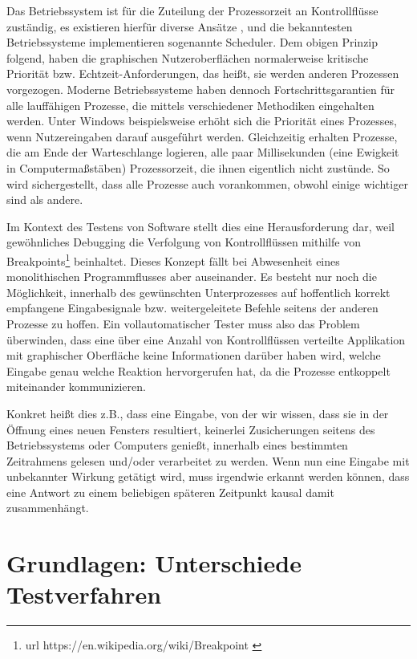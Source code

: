 Das Betriebssystem ist für die Zuteilung der Prozessorzeit an Kontrollflüsse
zuständig, es existieren hierfür diverse Ansätze \cite{ArpaciDusseau14-Book}, 
und die bekanntesten Betriebssysteme implementieren sogenannte \glqq{}Scheduler\grqq{}.
Dem obigen Prinzip folgend, haben die graphischen Nutzeroberflächen normalerweise
kritische Priorität bzw. \glqq{}Echtzeit\grqq{}-Anforderungen, das heißt, sie
werden anderen Prozessen vorgezogen. Moderne Betriebssysteme 
\cite{Stallings:2004:OS:993867} haben dennoch
Fortschrittsgarantien für alle lauffähigen Prozesse, die mittels verschiedener
Methodiken eingehalten werden. Unter Windows beispielsweise erhöht sich die
Priorität eines Prozesses, wenn Nutzereingaben darauf ausgeführt werden.
Gleichzeitig erhalten Prozesse, die am Ende der Warteschlange logieren,
alle paar Millisekunden (eine Ewigkeit in Computermaßstäben) Prozessorzeit,
die ihnen eigentlich nicht zustünde. So wird sichergestellt, dass alle Prozesse
auch vorankommen, obwohl einige wichtiger sind als andere.

Im Kontext des Testens von Software stellt dies eine Herausforderung dar,
weil gewöhnliches \glqq{}Debugging\grqq{} die Verfolgung von Kontrollflüssen
mithilfe von Breakpoints\footnote{ url{ https://en.wikipedia.org/wiki/Breakpoint } }
beinhaltet. Dieses Konzept fällt bei Abwesenheit eines monolithischen Programmflusses
aber auseinander. Es besteht nur noch die Möglichkeit, innerhalb des gewünschten
Unterprozesses auf hoffentlich korrekt empfangene Eingabesignale bzw. weitergeleitete
Befehle seitens der anderen Prozesse zu hoffen. Ein vollautomatischer Tester
muss also das Problem überwinden, dass eine über eine Anzahl von Kontrollflüssen
verteilte Applikation mit graphischer Oberfläche keine Informationen darüber
haben wird, welche Eingabe genau welche Reaktion hervorgerufen hat, da
die Prozesse entkoppelt miteinander kommunizieren.

Konkret heißt dies z.B., dass eine Eingabe, von der wir wissen, dass sie in der 
Öffnung eines neuen Fensters resultiert, keinerlei Zusicherungen seitens des 
Betriebssystems oder Computers genießt, innerhalb eines bestimmten Zeitrahmens 
gelesen und/oder verarbeitet zu werden. Wenn nun eine Eingabe mit unbekannter Wirkung 
getätigt wird, muss irgendwie erkannt werden können, dass eine Antwort zu einem 
beliebigen späteren Zeitpunkt kausal damit zusammenhängt.


\section{Grundlagen: Unterschiede Testverfahren}\label{section:testingapproaches}


